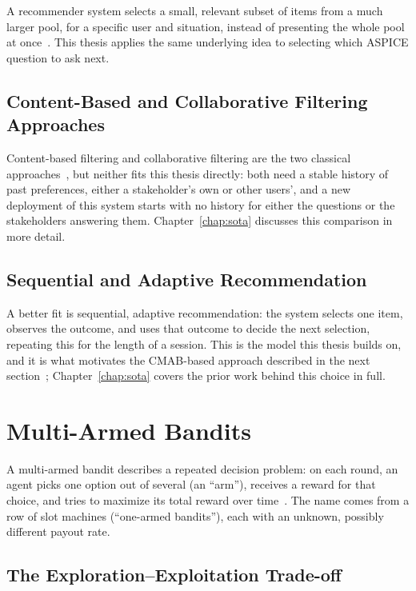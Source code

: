 \documentclass[a4paper, 12pt, oneside, openany, BCOR1cm,toc=chapterentrywithdots]{scrbook}
\begin{document}
A recommender system selects a small, relevant subset of items from a much larger pool, for a
specific user and situation, instead of presenting the whole pool at
once~\cite{lu2012recommendersystems}. This thesis applies the same underlying idea to selecting
which ASPICE question to ask next.

\subsection{Content-Based and Collaborative Filtering Approaches}

Content-based filtering and collaborative filtering are the two classical
approaches~\cite{lu2012recommendersystems}, but neither fits this thesis directly: both need a
stable history of past preferences, either a stakeholder's own or other users', and a new
deployment of this system starts with no history for either the questions or the stakeholders
answering them. Chapter~\ref{chap:sota} discusses this comparison in more detail.

\subsection{Sequential and Adaptive Recommendation}

A better fit is sequential, adaptive recommendation: the system selects one item, observes the
outcome, and uses that outcome to decide the next selection, repeating this for the length of a
session. This is the model this thesis builds on, and it is what motivates the CMAB-based
approach described in the next section~\cite{datsogiannis2024early}; Chapter~\ref{chap:sota}
covers the prior work behind this choice in full.

\section{Multi-Armed Bandits}

A multi-armed bandit describes a repeated decision problem: on each round, an agent picks one
option out of several (an ``arm''), receives a reward for that choice, and tries to maximize its
total reward over time~\cite{naeem2020gentleintro,sutton2018reinforcement}. The name comes from a
row of slot machines (``one-armed bandits''), each with an unknown, possibly different payout
rate.

\subsection{The Exploration--Exploitation Trade-off}
\end{document}

